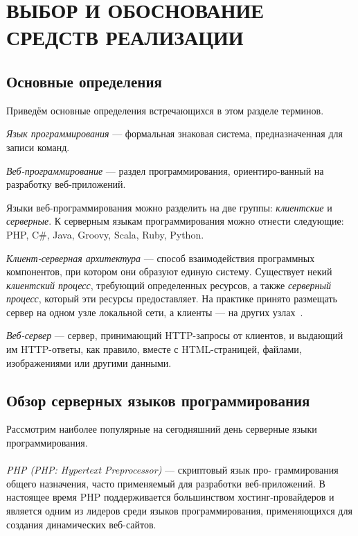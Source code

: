 \section[Выбор и обоснование средств реализации]{ВЫБОР И ОБОСНОВАНИЕ \\ СРЕДСТВ РЕАЛИЗАЦИИ}
\label{sec:choice}


\subsection{Основные определения}
\label{sub:choice_theory}

Приведём основные определения встречающихся в этом разделе терминов.

\textit{Язык программирования} --- формальная знаковая система, предназначенная для записи команд.

\textit{Веб-программирование} --- раздел программирования, ориентиро-ванный на разработку веб-приложений.

Языки веб-программирования можно разделить на две группы: \textit{клиентские}
и \textit{серверные}. К серверным языкам программирования можно
отнести следующие: PHP, C\#, Java, Groovy, Scala, Ruby, Python.

\textit{Клиент-серверная архитектура} --- способ взаимодействия программных компонентов,
при котором они образуют единую систему. Существует некий \textit{клиентский процесс},
требующий определенных ресурсов, а также \textit{серверный процесс}, который
эти ресурсы предоставляет. На практике принято размещать сервер на одном узле локальной сети,
а клиенты --- на других узлах~\cite{konnolli03}.

\textit{Веб-сервер} --- сервер, принимающий HTTP-запросы от клиентов, и выдающий им
HTTP-ответы, как правило, вместе с HTML-страницей, файлами, изображениями или другими данными.

\subsection{Обзор серверных языков программирования}
\label{sub:choice_server_language}

Рассмотрим наиболее популярные на сегодняшний день серверные языки программирования.

\paragraph{}
\textit{PHP (PHP: Hypertext Preprocessor)} --- скриптовый язык про-
граммирования общего назначения, часто применяемый для разработки веб-приложений.
В настоящее время PHP поддерживается большинством хостинг-провайдеров
и является одним из лидеров среди языков программирования, применяющихся для создания
динамических веб-сайтов.

